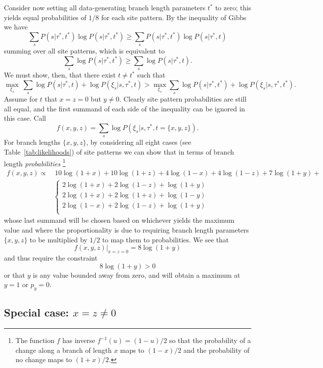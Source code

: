 \documentclass[a4paper]{article}
\begin{document}
Consider now setting all data-generating branch length parameters $t^*$ to zero; this yields equal probabilities of $1/8$ for each site pattern.
By the inequality of Gibbs we have
$$
\sum_{s} P(s|\tau^*,t^*)\log P(s|\tau^*,t^*) \geq \sum_{s} P(s|\tau^*,t^*)\log P(s|\tau^*,t)
$$
summing over all site patterns, which is equivalent to
$$
\sum_{s} \log P(s|\tau^*,t^*) \geq \sum_{s} \log P(s|\tau^*,t).
$$
We must show, then, that there exist $t\neq t^*$ such that
$$
\max_{\xi_s} \ \sum_{s} \log P(s | \tau^*, t) + \log P(\xi_s | s, \tau^*, t) > \max_{\xi_s} \sum_{s} \log P(s | \tau^*, t^*) + \log P(\xi_s | s, \tau^*, t^*).
$$
Assume for $t$ that $x=z=0$ but $y\neq 0$.
Clearly site pattern probabilities are still all equal, and the first summand of each side of the inequality can be ignored in this case.
Call
$$
f(x,y,z) = \sum_{s} \log P(\xi_s | s, \tau^*, t=\{x,y,z\}).
$$
For branch lengths $\{x,y,z\}$, by considering all eight cases (see Table~\ref{tab:likelihoods}) of site patterns we can show that in terms of branch length \emph{probabilities}%
    \footnote{The function $f$ has inverse $f^{-1}(u)=(1-u)/2$ so that the probability of a change along a branch of length $x$ maps to $(1-x)/2$ and the probability of no change maps to $(1+x)/2$.}
\begin{align}
f(x,y,z) \propto & \ 10\log(1+x)+10\log(1+z)+4\log(1-x)+4\log(1-z)+7\log(1+y)+\\
& \left\{ 
  \begin{array}{l}
  2\log(1+x)+2\log(1-z)+\log(1+y)\\
  2\log(1+x)+2\log(1+z)+\log(1-y)\\
  2\log(1-x)+2\log(1-z)+\log(1+y)\\
  \end{array} \right.
\end{align}
whose last summand will be chosen based on whichever yields the maximum value and where the proportionality is due to requiring branch length parameters $\{x,y,z\}$ to be multiplied by $1/2$ to map them to probabilities.
We see that
$$
f(x,y,z)|_{x=z=0} = 8\log(1+y)
$$
and thus require the constraint
$$
8\log(1+y) > 0
$$
or that $y$ is any value bounded away from zero, and will obtain a maximum at $y=1$ or $p_y=0$.

\subsection{Special case: $x=z\neq 0$}
\end{document}
